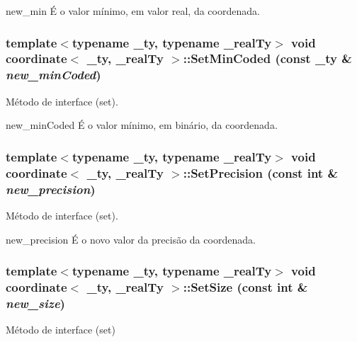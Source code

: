 new\_\-min É o valor mínimo, em valor real, da coordenada. \hypertarget{classcoordinate_a7a8c16521bfde82906c7a9013f7ef909}{
\subsubsection[{SetMinCoded}]{\setlength{\rightskip}{0pt plus 5cm}template$<$typename \_\-ty, typename \_\-realTy$>$ void {\bf coordinate}$<$ \_\-ty, \_\-realTy $>$::SetMinCoded (const \_\-ty \& {\em new\_\-minCoded})}}
\label{classcoordinate_a7a8c16521bfde82906c7a9013f7ef909}
Método de interface (set).

new\_\-minCoded É o valor mínimo, em binário, da coordenada. \hypertarget{classcoordinate_a46b633da2fed8687b33814122ad2ce1d}{
\subsubsection[{SetPrecision}]{\setlength{\rightskip}{0pt plus 5cm}template$<$typename \_\-ty, typename \_\-realTy$>$ void {\bf coordinate}$<$ \_\-ty, \_\-realTy $>$::SetPrecision (const int \& {\em new\_\-precision})}}
\label{classcoordinate_a46b633da2fed8687b33814122ad2ce1d}
Método de interface (set).

new\_\-precision É o novo valor da precisão da coordenada. \hypertarget{classcoordinate_a8dca6b1375bc84a05f66d8694681acbe}{
\subsubsection[{SetSize}]{\setlength{\rightskip}{0pt plus 5cm}template$<$typename \_\-ty, typename \_\-realTy$>$ void {\bf coordinate}$<$ \_\-ty, \_\-realTy $>$::SetSize (const int \& {\em new\_\-size})}}
\label{classcoordinate_a8dca6b1375bc84a05f66d8694681acbe}
Método de interface (set)

